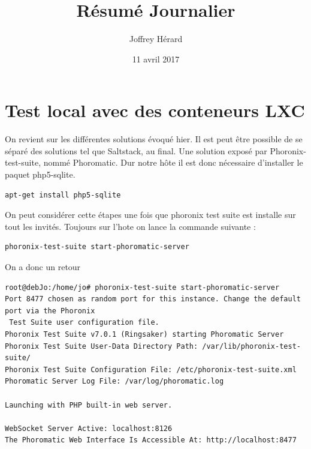 \documentclass[french]{article}
\begin{document}
\title{Résumé Journalier}
\author{Joffrey Hérard}
\date{11 avril 2017} 

\maketitle
\section{Test local avec des conteneurs LXC}
On revient sur les différentes solutions évoqué hier. 
Il est peut être possible de se séparé des solutions tel que Saltstack, au final. Une solution exposé par Phoronix-test-suite, nommé Phoromatic.
Dur notre hôte il est donc nécessaire d'installer le paquet php5-sqlite.
\begin{verbatim}
apt-get install php5-sqlite
\end{verbatim}
On peut considérer cette étapes une fois que phoronix test suite est installe sur tout les invités. 
Toujours sur l'hote on lance la commande suivante :   
\begin{verbatim}
phoronix-test-suite start-phoromatic-server
\end{verbatim}
On a donc un retour 
\begin{verbatim}
root@debJo:/home/jo# phoronix-test-suite start-phoromatic-server
Port 8477 chosen as random port for this instance. Change the default port via the Phoronix
 Test Suite user configuration file.
Phoronix Test Suite v7.0.1 (Ringsaker) starting Phoromatic Server
Phoronix Test Suite User-Data Directory Path: /var/lib/phoronix-test-suite/
Phoronix Test Suite Configuration File: /etc/phoronix-test-suite.xml
Phoromatic Server Log File: /var/log/phoromatic.log

Launching with PHP built-in web server.

WebSocket Server Active: localhost:8126
The Phoromatic Web Interface Is Accessible At: http://localhost:8477
\end{verbatim}
\newpage
\end{document}
